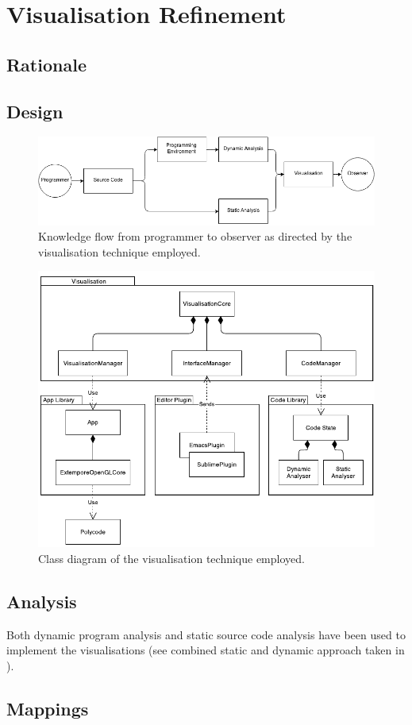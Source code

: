 
\chapter{Visualisation Refinement}
\label{chap:visualisation-refinement}

\section{Rationale}

\section{Design}

\begin{figure}
  \centering \includegraphics[width=\columnwidth]{../images/diagrams/knowledge-flow}
  \caption{Knowledge flow from programmer to observer as directed by the visualisation technique employed.}
\label{fig:knowledge-flow}
\end{figure}

\begin{figure}
  \centering \includegraphics[width=\columnwidth]{../images/diagrams/visualisation-class-diagram}
  \caption{Class diagram of the visualisation technique employed.}
\label{fig:visualisation-class-diagram}
\end{figure}

\section{Analysis}

Both dynamic program analysis and static source code analysis have been used to implement the visualisations (see combined static and dynamic approach taken in \cite{Eisenbarth2003}).

\section{Mappings}